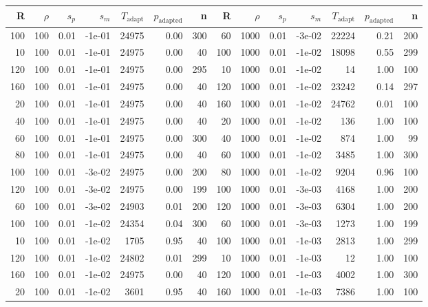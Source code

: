 \begin{table}[ht]
\centering
{\tiny
\begin{tabular}{|rrrrrrr||rrrrrrr|}
  \hline
R & $\rho$ & $s_p$ & $s_m$ & $T_\text{adapt}$ & $p_\text{adapted}$ & n & R & $\rho$ & $s_p$ & $s_m$ & $T_\text{adapt}$ & $p_\text{adapted}$ & n \\ 
  \hline
100 & 100 & 0.01 & -1e-01 & 24975 & 0.00 & 300 & 60 & 1000 & 0.01 & -3e-02 & 22224 & 0.21 & 200 \\ 
  10 & 100 & 0.01 & -1e-01 & 24975 & 0.00 & 40 & 100 & 1000 & 0.01 & -1e-02 & 18098 & 0.55 & 299 \\ 
  120 & 100 & 0.01 & -1e-01 & 24975 & 0.00 & 295 & 10 & 1000 & 0.01 & -1e-02 & 14 & 1.00 & 100 \\ 
  160 & 100 & 0.01 & -1e-01 & 24975 & 0.00 & 40 & 120 & 1000 & 0.01 & -1e-02 & 23242 & 0.14 & 297 \\ 
  20 & 100 & 0.01 & -1e-01 & 24975 & 0.00 & 40 & 160 & 1000 & 0.01 & -1e-02 & 24762 & 0.01 & 100 \\ 
  40 & 100 & 0.01 & -1e-01 & 24975 & 0.00 & 40 & 20 & 1000 & 0.01 & -1e-02 & 136 & 1.00 & 100 \\ 
  60 & 100 & 0.01 & -1e-01 & 24975 & 0.00 & 300 & 40 & 1000 & 0.01 & -1e-02 & 874 & 1.00 & 99 \\ 
  80 & 100 & 0.01 & -1e-01 & 24975 & 0.00 & 40 & 60 & 1000 & 0.01 & -1e-02 & 3485 & 1.00 & 300 \\ 
  100 & 100 & 0.01 & -3e-02 & 24975 & 0.00 & 200 & 80 & 1000 & 0.01 & -1e-02 & 9204 & 0.96 & 100 \\ 
  120 & 100 & 0.01 & -3e-02 & 24975 & 0.00 & 199 & 100 & 1000 & 0.01 & -3e-03 & 4168 & 1.00 & 200 \\ 
  60 & 100 & 0.01 & -3e-02 & 24903 & 0.01 & 200 & 120 & 1000 & 0.01 & -3e-03 & 6304 & 1.00 & 200 \\ 
  100 & 100 & 0.01 & -1e-02 & 24354 & 0.04 & 300 & 60 & 1000 & 0.01 & -3e-03 & 1273 & 1.00 & 199 \\ 
  10 & 100 & 0.01 & -1e-02 & 1705 & 0.95 & 40 & 100 & 1000 & 0.01 & -1e-03 & 2813 & 1.00 & 299 \\ 
  120 & 100 & 0.01 & -1e-02 & 24802 & 0.01 & 299 & 10 & 1000 & 0.01 & -1e-03 & 12 & 1.00 & 100 \\ 
  160 & 100 & 0.01 & -1e-02 & 24975 & 0.00 & 40 & 120 & 1000 & 0.01 & -1e-03 & 4002 & 1.00 & 300 \\ 
  20 & 100 & 0.01 & -1e-02 & 3601 & 0.95 & 40 & 160 & 1000 & 0.01 & -1e-03 & 7386 & 1.00 & 100 \\ 

\end{tabular}}
\end{table}

